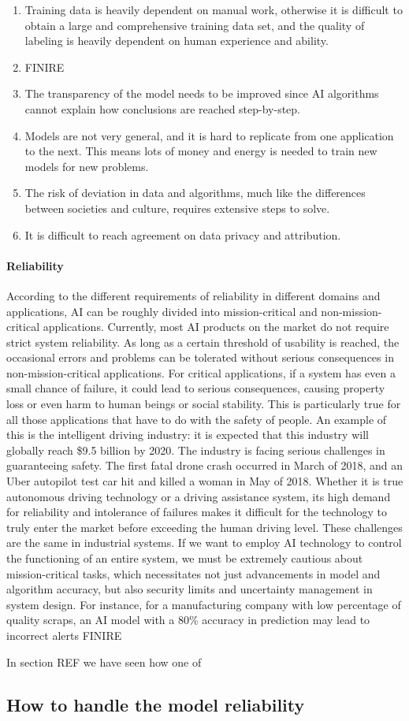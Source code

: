 \begin{enumerate}
    \item Training data is heavily dependent on manual work, otherwise it is difficult to obtain a large and comprehensive training data set, and the quality of labeling is heavily dependent on human experience and ability.
    \item FINIRE
    \item The transparency of the model needs to be improved since AI algorithms cannot explain how conclusions are reached step-by-step.
    \item Models are not very general, and it is hard to replicate from one application to the next. This means lots of money and energy is needed to train new models for new problems.
    \item The risk of deviation in data and algorithms, much
    like the differences between societies and culture, requires extensive steps to solve.
    \item It is difficult to reach agreement on data privacy and attribution.
\end{enumerate}

\paragraph{Reliability}


According to the different requirements of reliability in different domains and applications, AI can be roughly divided into mission-critical and non-mission-critical applications. Currently, most AI products on the market do not require strict system reliability. As long as a certain threshold of usability is reached, the occasional errors and problems can be tolerated without serious consequences in non-mission-critical applications. For critical applications, if a system has even a small chance of failure, it could lead to serious consequences, causing property loss or even harm to human beings or social stability. This is particularly true for all those applications that have to do with the safety of people. An example of this is the intelligent driving industry: it is expected
that this industry will globally reach \$9.5 billion by 2020. The industry is facing serious challenges in guaranteeing safety. The first fatal drone crash occurred in March of 2018, and an Uber autopilot test car hit and killed a woman in May of 2018. Whether it is true autonomous driving technology or a driving assistance system, its high demand for reliability and intolerance of failures makes it difficult for the technology to truly enter the market before exceeding the human driving level. These challenges are the same in industrial systems. If we want to employ AI technology to control the functioning of an entire system, we must be extremely cautious about mission-critical tasks, which necessitates not just advancements in model and algorithm accuracy, but also security limits and uncertainty management in system design. For instance, for a manufacturing company with low percentage of quality scraps, an AI model with a 80\% accuracy in prediction may lead to incorrect alerts FINIRE 


In section REF we have seen how one of

\subsection{How to handle the model reliability}